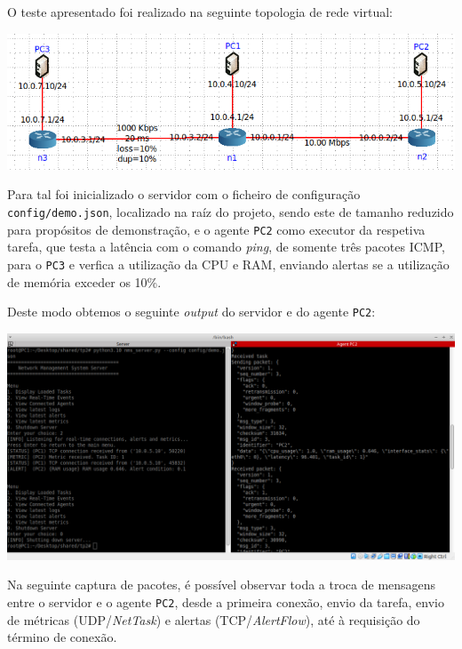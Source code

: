 \documentclass[a4paper,12pt]{scrreprt}
\begin{document}
O teste apresentado foi realizado na seguinte topologia de rede virtual:

\begin{minipage}{\textwidth}
    \centering
    \includegraphics[width=\textwidth]{img/demo/topology.png}
    \label{fig:demo_topology}
\end{minipage}

Para tal foi inicializado o servidor com o ficheiro de configuração \texttt{config/demo.json},
localizado na raíz do projeto, sendo este de tamanho reduzido para propósitos de demonstração,
e o agente \texttt{PC2} como executor da respetiva tarefa, que testa a latência com o comando
\textit{ping}, de somente três pacotes ICMP, para o \texttt{PC3} e verfica a utilização da CPU e RAM,
enviando alertas se a utilização de memória exceder os 10\%.

Deste modo obtemos o seguinte \textit{output} do servidor e do agente \texttt{PC2}:

\begin{minipage}{\textwidth}
    \centering
    \includegraphics[width=\textwidth]{img/demo/terminal_output.png}
    \label{fig:demo_terminal_output}
\end{minipage}


Na seguinte captura de pacotes, é possível observar toda a troca de mensagens entre o servidor
e o agente \texttt{PC2}, desde a primeira conexão, envio da tarefa, envio de métricas (UDP/\textit{NetTask})
e alertas (TCP/\textit{AlertFlow}), até à requisição do término de conexão.
\end{document}
